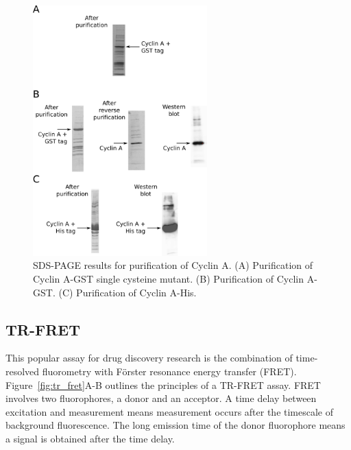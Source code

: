 \begin{figure}
\centering

\includegraphics[width=0.6\textwidth]{figures/purification/purification}

\caption[SDS-PAGE results for purification of Cyclin A]
{SDS-PAGE results for purification of Cyclin A.
(A) Purification of Cyclin A-GST single cysteine mutant.
(B) Purification of Cyclin A-GST.
(C) Purification of Cyclin A-His.}

\label{fig:purification}
\end{figure}


\subsection{TR-FRET}

This popular assay for drug discovery research is the combination of time-resolved fluorometry with F\"{o}rster resonance energy transfer (FRET).
Figure~\ref{fig:tr_fret}A-B outlines the principles of a TR-FRET assay.
FRET involves two fluorophores, a donor and an acceptor.
A time delay between excitation and measurement means measurement occurs after the timescale of background fluorescence.
The long emission time of the donor fluorophore means a signal is obtained after the time delay.

